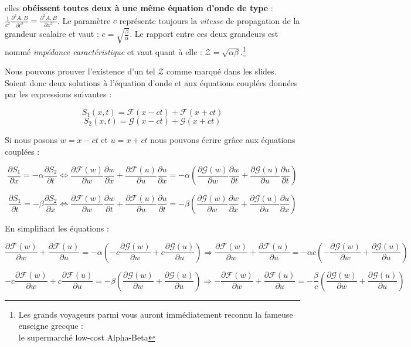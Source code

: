 elles \textbf{obéissent toutes deux à une même équation d'onde de type} : $\frac{1}{c^{2}} \frac{\partial^{2} A,B}{\partial t^{2}} = \frac{\partial^{2} A,B}{\partial x^{2}}$. 
Le paramètre $c$ représente toujours la \textit{vitesse} de propagation de la grandeur scalaire et vaut : $c = \sqrt{\frac{\beta}{\alpha}}$. 
Le rapport entre ces deux grandeurs est nommé \textit{impédance caractéristique} et vaut quant à elle : $\mathcal{Z} = \sqrt{\alpha\beta}$.\footnote{Les grands voyageurs parmi vous auront immédiatement reconnu la fameuse enseigne grecque :\\ le supermarché low-cost Alpha-Beta} 

Nous pouvons prouver l'existence d'un tel $\mathcal{Z}$ comme marqué dans les slides. Soient donc deux solutions à l'équation d'onde et aux équations couplées données par les expressions suivantes :

\[S_{1}(x,t) = \mathcal{F}(x-ct) + \mathcal{F}(x+ct)\]
\[S_{2}(x,t) = \mathcal{G}(x-ct) + \mathcal{G}(x+ct)\]

Si nous posons $w = x-ct$ et $u = x+ct$ nous pouvons écrire grâce aux équations couplées : 
\begin{fullwidth}
	\[\frac{\partial S_{1}}{\partial x} = -\alpha \frac{\partial S_{2}}{\partial t} \Leftrightarrow \frac{\partial \mathcal{F}(w)}{\partial w}\frac{\partial w}{\partial x} + \frac{\partial \mathcal{F}(u)}{\partial u}\frac{\partial u}{\partial x} 
	= -\alpha (\frac{\partial \mathcal{G}(w)}{\partial w}\frac{\partial w}{\partial t} + \frac{\partial \mathcal{G}(u)}{\partial u}\frac{\partial u}{\partial t})\]
	
	\[\frac{\partial S_{1}}{\partial t} = -\beta \frac{\partial S_{2}}{\partial x} \Leftrightarrow \frac{\partial \mathcal{F}(w)}{\partial w}\frac{\partial w}{\partial t} + \frac{\partial \mathcal{F}(u)}{\partial u}\frac{\partial u}{\partial t} 
	= -\beta (\frac{\partial \mathcal{G}(w)}{\partial w}\frac{\partial w}{\partial x} + \frac{\partial \mathcal{G}(u)}{\partial u}\frac{\partial u}{\partial x})\]
\end{fullwidth}	
	En simplifiant les équations : 
\begin{fullwidth}	
	\begin{equation}
	\frac{\partial \mathcal{F}(w)}{\partial w} + \frac{\partial \mathcal{F}(u)}{\partial u}
	= -\alpha (-c \frac{\partial \mathcal{G}(w)}{\partial w} + c \frac{\partial \mathcal{G}(u)}{\partial u}) \Rightarrow
	\frac{\partial \mathcal{F}(w)}{\partial w} + \frac{\partial \mathcal{F}(u)}{\partial u} = -\alpha c (-\frac{\partial \mathcal{G}(w)}{\partial w} +\frac{\partial \mathcal{G}(u)}{\partial u}) 
	\end{equation}
	
	\begin{equation}
	-c \frac{\partial \mathcal{F}(w)}{\partial w} + c \frac{\partial \mathcal{F}(u)}{\partial u}
	= -\beta (\frac{\partial \mathcal{G}(w)}{\partial w} + \frac{\partial \mathcal{G}(u)}{\partial u}) \Rightarrow -\frac{\partial \mathcal{F}(w)}{\partial w} + \frac{\partial \mathcal{F}(u)}{\partial u}
	= -\frac{\beta}{c} (\frac{\partial \mathcal{G}(w)}{\partial w} + \frac{\partial \mathcal{G}(u)}{\partial u})
	\end{equation}
\end{fullwidth}	

